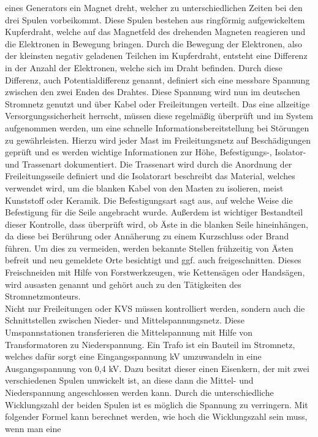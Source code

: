 eines Generators ein Magnet dreht, welcher zu unterschiedlichen Zeiten bei den drei Spulen vorbeikommt. Diese Spulen bestehen aus ringförmig aufgewickeltem 
Kupferdraht, welche auf das Magnetfeld des drehenden Magneten reagieren und die Elektronen in Bewegung bringen. Durch die Bewegung der Elektronen, also der 
kleinsten negativ geladenen Teilchen im Kupferdraht, entsteht eine Differenz in der Anzahl der Elektronen, welche sich im Draht befinden. Durch diese 
Differenz, auch Potentialdifferenz genannt, definiert sich eine messbare Spannung zwischen den zwei Enden des Drahtes. Diese Spannung wird nun im deutschen 
Stromnetz genutzt und über Kabel oder Freileitungen verteilt. Das eine allzeitige Versorgungssicherheit herrscht, müssen diese regelmäßig überprüft und im 
System aufgenommen werden, um eine schnelle Informationsbereitstellung bei Störungen zu gewährleisten. Hierzu wird jeder Mast im Freileitungsnetz auf 
Beschädigungen geprüft und es werden wichtige Informationen zur Höhe, Befestigungs-, Isolator- und Trassenart dokumentiert. Die Trassenart wird durch die 
Anordnung der Freileitungsseile definiert und die Isolatorart beschreibt das Material, welches verwendet wird, um die blanken Kabel von den Masten zu 
isolieren, meist Kunststoff oder Keramik. Die Befestigungsart sagt aus, auf welche Weise die Befestigung für die Seile angebracht wurde. Außerdem ist 
wichtiger Bestandteil dieser Kontrolle, dass überprüft wird, ob Äste in die blanken Seile hineinhängen, da diese bei Berührung oder Annäherung zu einem 
Kurzschluss oder Brand führen. Um dies zu vermeiden, werden bekannte Stellen frühzeitig von Ästen befreit und neu gemeldete Orte besichtigt und ggf. auch 
freigeschnitten. Dieses Freischneiden mit Hilfe von Forstwerkzeugen, wie Kettensägen oder Handsägen, wird ausasten genannt und gehört auch zu den 
Tätigkeiten des Stromnetzmonteurs.\\
Nicht nur Freileitungen oder KVS müssen kontrolliert werden, sondern auch die Schnittstellen zwischen Nieder- und Mittelspannungsnetz. Diese Umspannstationen 
transferieren die Mittelspannung mit Hilfe von Transformatoren zu Niederspannung. Ein Trafo ist ein Bauteil im Stromnetz, welches dafür sorgt eine 
Eingangsspannung  kV umzuwandeln in eine Ausgangsspannung von 0,4 kV. Dazu besitzt dieser einen Eisenkern, der mit zwei verschiedenen Spulen 
umwickelt ist, an diese dann die Mittel- und Niederspannung angeschlossen werden kann. Durch die unterschiedliche Wicklungszahl der beiden Spulen ist 
es möglich die Spannung zu verringern. Mit folgender Formel kann berechnet werden, wie hoch die Wicklungszahl sein muss, wenn man \zB eine 
